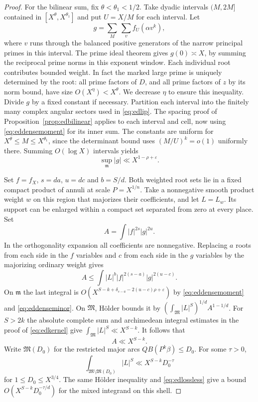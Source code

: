 \documentclass[11pt,letterpaper]{article}
\theoremstyle{definition}
\numberwithin{equation}{section}
\begin{document}
\begin{proof}
For the bilinear sum, fix $\theta<\theta_1<1/2$. Take dyadic
intervals $(M,2M]$ contained in $[X^\theta,X^{\theta_1}]$ and put
$U=X/M$ for each interval. Let
\[
  g=\sum_M\ \sum_v f_U(\alpha v^k),
\]
where $v$ runs through the balanced positive generators of the narrow
principal primes in this interval. The prime ideal theorem gives
$g(0)\asymp X$, by summing the reciprocal prime norms in this
exponent window. Each individual root contributes bounded weight.
In fact the marked large prime is uniquely determined by the root:
all prime factors of $D$, and all prime factors of $z$ by its norm
bound, have size $O(X^\eta)<X^\theta$. We decrease $\eta$ to ensure
this inequality. Divide $g$ by a fixed constant if necessary.
Partition each interval into the finitely many complex angular
sectors used in \eqref{eq:edlip}. The spacing proof of
Proposition~\ref{prop:edbilinear} applies to each interval and cell,
now using \eqref{eq:eddensemoment} for its inner sum. The constants
are uniform for $X^\theta\le M\le X^{\theta_1}$, since the determinant
bound uses $(M/U)^k=o(1)$ uniformly there. Summing $O(\log X)$ intervals
yields
\begin{equation}\label{eq:eddenseminor}
                    \sup_{\mathfrak m}|g|\ll X^{1-\rho+\varepsilon}.
\end{equation}

Set $f=f_X$, $s=da$, $u=dc$ and $b=S/d$. Both weighted root sets lie
in a fixed compact product of annuli at scale $P=X^{1/n}$.
Take a nonnegative smooth product weight $w$ on this region that
majorizes their coefficients, and let $L=L_w$. Its support can be
enlarged within a compact set separated from zero at every place.
Set
\[
                       A=\int |f|^{2s}|g|^{2u}.
\]
In the orthogonality expansion all coefficients are nonnegative.
Replacing $a$ roots from each side in the $f$ variables and $c$
from each side in the $g$ variables by the majorizing ordinary
weight gives
\[
       A\le\int |L|^b |f|^{2(s-a)} |g|^{2(u-c)} .
\]
On $\mathfrak m$ the last integral is
$O(X^{S-k+\delta_{s-a}-2(u-c)\rho+\varepsilon})$ by
\eqref{eq:eddensemoment} and \eqref{eq:eddenseminor}.
On $\mathfrak M$, H\"older bounds it by
$(\int_{\mathfrak M}|L|^S)^{1/d}A^{1-1/d}$.
For $S>2k$ the absolute complete sum and archimedean integral
estimates in the proof of \eqref{eq:edkernel} give
$\int_{\mathfrak M}|L|^S\ll X^{S-k}$. It follows that
\begin{equation}\label{eq:edlossless}
                            A\ll X^{S-k}.
\end{equation}
Write $\mathfrak M(D_0)$ for the restricted major arcs
$Q B(P^k\beta)\le D_0$. For some $\tau>0$,
\[
      \int_{\mathfrak M\setminus\mathfrak M(D_0)}|L|^S
                    \ll X^{S-k}D_0^{-\tau}
\]
for $1\le D_0\le X^{3/4}$. The same H\"older inequality and
\eqref{eq:edlossless} give a bound
$O(X^{S-k}D_0^{-\tau/d})$ for the mixed integrand on this shell.


\end{proof}
\end{document}

